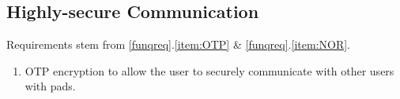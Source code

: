 \subsection{Highly-secure Communication}
Requirements stem from \ref{funqreq}.\ref{item:OTP} \& \ref{funqreq}.\ref{item:NOR}.
\begin{enumerate}
\item OTP encryption to allow the user to securely communicate with other users with pads.
\end{enumerate}




